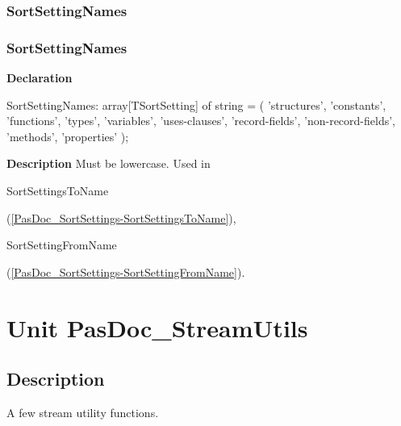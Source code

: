 \documentclass{report}
\newif\ifpdf
\begin{document}
\subsection*{\large{\textbf{SortSettingNames}}\normalsize\hspace{1ex}\hrulefill}
\else
\subsection*{SortSettingNames}
\fi
\label{PasDoc_SortSettings-SortSettingNames}
\begin{list}{}{
\setlength{\itemindent}{0cm}
\setlength{\listparindent}{0cm}
\setlength{\leftmargin}{\evensidemargin}
\addtolength{\leftmargin}{\tmplength}
\settowidth{\labelsep}{X}
\addtolength{\leftmargin}{\labelsep}
\setlength{\labelwidth}{\tmplength}
}
\item[\textbf{Declaration}\hfill]
\ifpdf
\begin{flushleft}
\fi
\begin{ttfamily}
SortSettingNames: array[TSortSetting] of string = (
    'structures', 'constants', 'functions', 'types', 'variables', 'uses-clauses',
    'record-fields', 'non-record-fields', 'methods', 'properties' );\end{ttfamily}

\ifpdf
\end{flushleft}
\fi

\par
\item[\textbf{Description}]
Must be lowercase. Used in \begin{ttfamily}SortSettingsToName\end{ttfamily}(\ref{PasDoc_SortSettings-SortSettingsToName}), \begin{ttfamily}SortSettingFromName\end{ttfamily}(\ref{PasDoc_SortSettings-SortSettingFromName}).

\end{list}
\chapter{Unit PasDoc{\_}StreamUtils}
\label{PasDoc_StreamUtils}
\section{Description}
A few stream utility functions.\hfill\vspace*{1ex}
\end{document}
